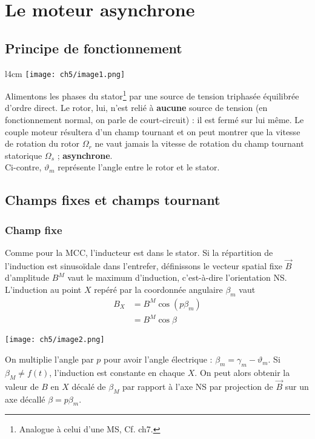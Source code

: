 \chapter{Le moteur asynchrone}
\section{Principe de fonctionnement}
	\begin{wrapfigure}[10]{l}{4cm}
	\vspace{-5mm}
	\texttt{[image: ch5/image1.png]}
	\end{wrapfigure}
Alimentons les phases du stator\footnote{Analogue à celui d'une MS, Cf. ch7.} 
par une source de tension triphasée équilibrée d'ordre direct. Le rotor, lui, 
n'est relié à \textbf{aucune} source de tension (en fonctionnement normal, on 
parle de court-circuit) : il est fermé sur lui même. 
Le couple moteur résultera d'un champ tournant et on peut montrer que la vitesse 
de rotation du rotor $\Omega_r$ ne vaut jamais la vitesse de rotation du 
champ tournant statorique $\Omega_s$ ; \textbf{asynchrone}.\\

Ci-contre, $\vartheta_m$ représente l'angle entre le rotor et le stator. 


\section{Champs fixes et champs tournant}
	\subsection{Champ fixe}
	Comme pour la MCC, l'inducteur est dans le stator. Si la répartition de 
	l'induction est sinusoïdale dans l'entrefer, définissons le vecteur 
	spatial fixe $\vec{B}$ d'amplitude $B^M$ vaut le maximum d'induction, 
	c'est-à-dire l'orientation NS. L'induction au point $X$ repéré par la 
	coordonnée angulaire $\beta_m$ vaut
	\begin{equation}
	\begin{array}{ll}
	B_X &= B^M\cos(p\beta_m)\\
	&= B^M\cos\beta
	\end{array}
	\end{equation}
	\begin{center}
	\texttt{[image: ch5/image2.png]}
	\end{center}
	On multiplie l'angle par $p$ pour avoir l'angle électrique : $\beta_m = 
	\gamma_m-\vartheta_m$. Si $\beta_M \neq f(t)$, l'induction est constante 
	en chaque $X$. On peut alors obtenir la valeur de $B$ en $X$ décalé de 
	$\beta_M$ par rapport à l'axe NS par projection de $\vec{B}$ sur un axe 
	décallé $\beta = p\beta_m$.
	\newpage
	
